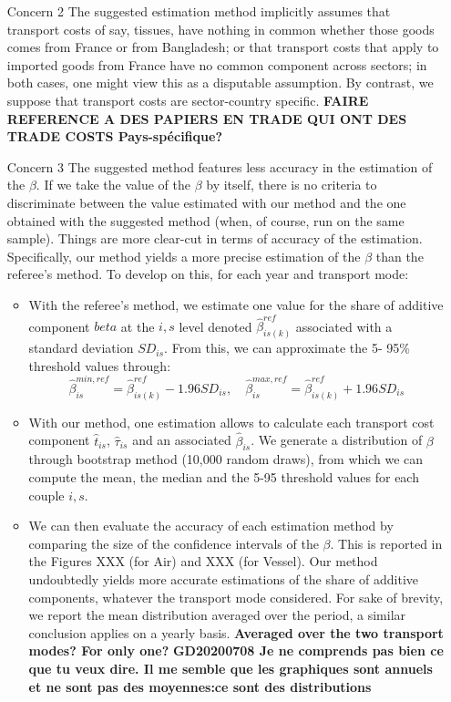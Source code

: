 \documentclass[a4paper,12pt]{article}
\begin{document}
\begin{itemize}
\begin{enumerate}
    \end{enumerate}
\item[Concern 2] The suggested estimation method implicitly assumes that transport costs of say, tissues, have nothing in common whether those goods comes from France or from Bangladesh; or that transport costs that apply to imported goods from France have no common component across sectors; in both cases, one might view this as a disputable assumption. By contrast, we suppose that transport costs are sector-country specific. \textbf{FAIRE REFERENCE A DES PAPIERS EN TRADE QUI ONT DES TRADE COSTS Pays-spécifique?}
\item[Concern 3] The suggested method features less accuracy in the estimation of the $\beta$. If we take the value of the $\beta$ by itself, there is no criteria to discriminate between the value estimated with our method and the one obtained with the suggested method (when, of course, run on the same sample). Things are more clear-cut in terms of accuracy of the estimation. Specifically, our method yields a more precise estimation of the $\beta$ than the referee's method. To develop on this, for each year and transport mode:
    \begin{itemize}
    \item With the referee's method, we estimate one value for the share of additive component $beta$ at the $i,s$ level denoted $\hat{\beta}^{ref}_{is(k)}$ associated with a standard deviation $SD_{is}$. From this, we can approximate the 5- 95\% threshold values through:
        $$\hat{\beta}_{is}^{min,ref} = \hat{\beta}^{ref}_{is(k)} - 1.96 SD_{is},\quad \hat{\beta}_{is}^{max,ref} = \hat{\beta}^{ref}_{is(k)} + 1.96 SD_{is}$$

    \item  With our method, one estimation allows to calculate each transport cost component $\hat{t}_{is}$, $\hat{\tau}_{is}$ and an associated $\hat{\beta}_{is}$. We generate a distribution of $\beta$ through bootstrap method (10,000 random draws), from which we can compute the mean, the median and the 5-95 threshold values for each couple $i,s$.

    \item We can then evaluate the accuracy of each estimation method by comparing the size of the confidence intervals of the $\beta$. This is reported in the Figures XXX (for Air) and XXX (for Vessel). Our method undoubtedly yields more accurate estimations of the share of additive components, whatever the transport mode considered. For sake of brevity, we report the mean distribution averaged over the period, a similar conclusion applies on a yearly basis. \textbf{Averaged over the two transport modes? For only one?} \textbf{GD20200708 Je ne comprends pas bien ce que tu veux dire. Il me semble que les graphiques sont annuels et ne sont pas des moyennes:ce sont des distributions}



\end{itemize}
\end{itemize}
\end{document}
